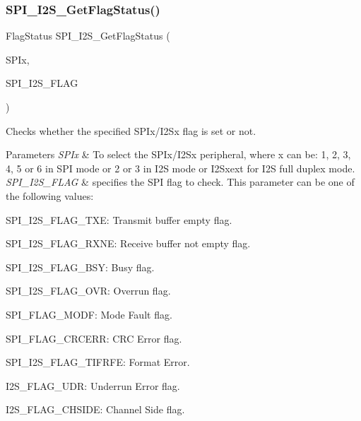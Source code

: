 \subsubsection{\texorpdfstring{S\+P\+I\+\_\+\+I2\+S\+\_\+\+Get\+Flag\+Status()}{SPI\_I2S\_GetFlagStatus()}}
{\footnotesize\ttfamily Flag\+Status S\+P\+I\+\_\+\+I2\+S\+\_\+\+Get\+Flag\+Status (\begin{DoxyParamCaption}\item[{S\+P\+I\+\_\+\+Type\+Def $\ast$}]{S\+P\+Ix,  }\item[{uint16\+\_\+t}]{S\+P\+I\+\_\+\+I2\+S\+\_\+\+F\+L\+AG }\end{DoxyParamCaption})}



Checks whether the specified S\+P\+Ix/\+I2\+Sx flag is set or not. 


\begin{DoxyParams}{Parameters}
{\em S\+P\+Ix} & To select the S\+P\+Ix/\+I2\+Sx peripheral, where x can be\+: 1, 2, 3, 4, 5 or 6 in S\+PI mode or 2 or 3 in I2S mode or I2\+Sxext for I2S full duplex mode. \\
\hline
{\em S\+P\+I\+\_\+\+I2\+S\+\_\+\+F\+L\+AG} & specifies the S\+PI flag to check. This parameter can be one of the following values\+: \begin{DoxyItemize}
\item S\+P\+I\+\_\+\+I2\+S\+\_\+\+F\+L\+A\+G\+\_\+\+T\+XE\+: Transmit buffer empty flag. \item S\+P\+I\+\_\+\+I2\+S\+\_\+\+F\+L\+A\+G\+\_\+\+R\+X\+NE\+: Receive buffer not empty flag. \item S\+P\+I\+\_\+\+I2\+S\+\_\+\+F\+L\+A\+G\+\_\+\+B\+SY\+: Busy flag. \item S\+P\+I\+\_\+\+I2\+S\+\_\+\+F\+L\+A\+G\+\_\+\+O\+VR\+: Overrun flag. \item S\+P\+I\+\_\+\+F\+L\+A\+G\+\_\+\+M\+O\+DF\+: Mode Fault flag. \item S\+P\+I\+\_\+\+F\+L\+A\+G\+\_\+\+C\+R\+C\+E\+RR\+: C\+RC Error flag. \item S\+P\+I\+\_\+\+I2\+S\+\_\+\+F\+L\+A\+G\+\_\+\+T\+I\+F\+R\+FE\+: Format Error. \item I2\+S\+\_\+\+F\+L\+A\+G\+\_\+\+U\+DR\+: Underrun Error flag. \item I2\+S\+\_\+\+F\+L\+A\+G\+\_\+\+C\+H\+S\+I\+DE\+: Channel Side flag. ~\newline
\end{DoxyItemize}
\\
\hline
\end{DoxyParams}

